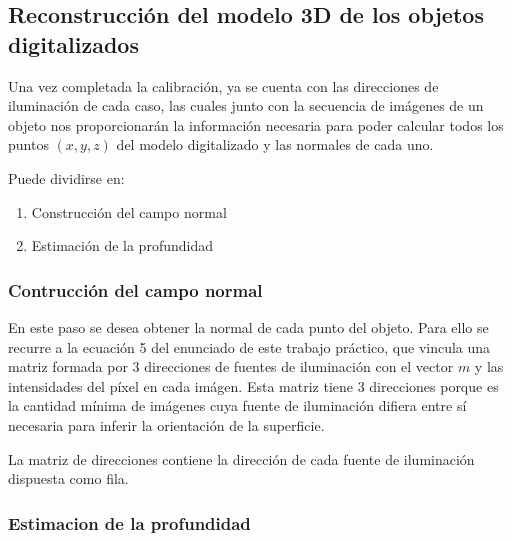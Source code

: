 \subsection{Reconstrucción del modelo 3D de los objetos digitalizados}

Una vez completada la calibración, ya se cuenta con las direcciones de
iluminación de cada caso, las cuales junto con la secuencia de imágenes de un
objeto nos proporcionarán la información necesaria para poder calcular todos
los puntos $(x,y,z)$ del modelo digitalizado y las normales de cada uno.

Puede dividirse en:

\begin{enumerate}
\item Construcción del campo normal
\item Estimación de la profundidad
\end{enumerate}

\subsubsection{Contrucción del campo normal}

En este paso se desea obtener la normal de cada punto del objeto. Para ello
se recurre a la ecuación 5 del enunciado de este trabajo práctico, que
vincula una matriz formada por 3 direcciones de fuentes de iluminación con el
vector $m$ y las intensidades del píxel en cada imágen. Esta matriz tiene 3 direcciones porque es la cantidad mínima de imágenes cuya fuente de iluminación difiera entre sí necesaria para inferir la orientación de la superficie.

La matriz de
direcciones contiene la dirección de cada fuente de iluminación dispuesta como fila.

\subsubsection{Estimacion de la profundidad}